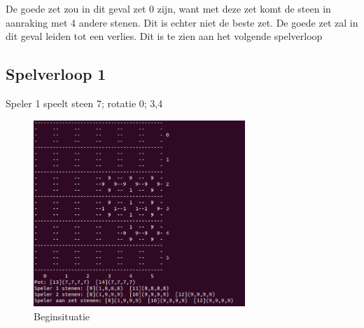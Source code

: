 \documentclass{article}
\begin{document}
De goede zet zou in dit geval zet 0 zijn, want met deze zet komt de steen in aanraking met 4 andere stenen. Dit is echter niet de beste zet. De goede zet zal in dit geval leiden tot een verlies. Dit is te zien aan het volgende spelverloop\\
\newpage
\subsection{Spelverloop 1}
Speler 1 speelt steen 7; rotatie 0; 3,4\\

\begin{figure}[htp]
    \centering
    \includegraphics[width=8cm]{algo1/imgs/two.png}
    \caption{Beginsituatie}
    \label{fig:galaxy}
\end{figure}
\newpage
\end{document}
